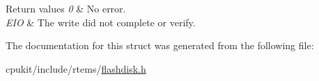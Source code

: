 \begin{DoxyRetVals}{Return values}
{\em 0} & No error. \\
\hline
{\em E\+IO} & The write did not complete or verify. \\
\hline
\end{DoxyRetVals}


The documentation for this struct was generated from the following file\+:\begin{DoxyCompactItemize}
\item 
cpukit/include/rtems/\mbox{\hyperlink{flashdisk_8h}{flashdisk.\+h}}\end{DoxyCompactItemize}
